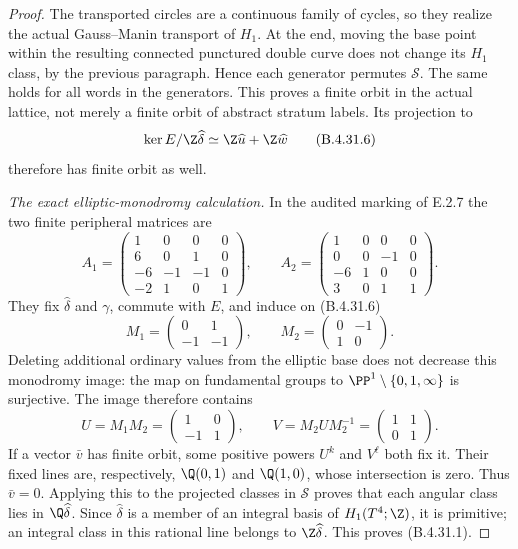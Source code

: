 \begin{proof}
The transported circles are a continuous family of cycles,
so they realize the actual Gauss--Manin transport of $H_1$.
At the end, moving the base point within the resulting
connected punctured double curve does not change its $H_1$
class, by the previous paragraph. Hence each generator
permutes $\mathscr S$. The same holds for all words in the
generators. This proves a finite orbit in the actual lattice,
not merely a finite orbit of abstract stratum labels.
Its projection to
\[
 \ker E/\Z\widehat\delta
       \simeq \Z\widehat u+\Z\widehat w
 \tag{B.4.31.6}
\]
therefore has finite orbit as well.

\emph{The exact elliptic-monodromy calculation.}
In the audited marking of E.2.7 the two finite peripheral
matrices are
\[
 A_1=\begin{pmatrix}
 1&0&0&0\\6&0&1&0\\-6&-1&-1&0\\-2&1&0&1
 \end{pmatrix},\qquad
 A_2=\begin{pmatrix}
 1&0&0&0\\0&0&-1&0\\-6&1&0&0\\3&0&1&1
 \end{pmatrix}.
 \tag{B.4.31.7}
\]
They fix $\widehat\delta$ and $\gamma$, commute with $E$,
and induce on (B.4.31.6)
\[
 M_1=\begin{pmatrix}0&1\\-1&-1\end{pmatrix},\qquad
 M_2=\begin{pmatrix}0&-1\\1&0\end{pmatrix}.
\]
Deleting additional ordinary values from the elliptic base
does not decrease this monodromy image: the map on fundamental
groups to $\PP^1\setminus\{0,1,\infty\}$ is surjective.
The image therefore contains
\[
 U=M_1M_2=\begin{pmatrix}1&0\\-1&1\end{pmatrix},\qquad
 V=M_2UM_2^{-1}=\begin{pmatrix}1&1\\0&1\end{pmatrix}.
 \tag{B.4.31.8}
\]
If a vector $\bar v$ has finite orbit, some positive powers
$U^k$ and $V^\ell$ both fix it. Their fixed lines are,
respectively, $\Q(0,1)$ and $\Q(1,0)$, whose intersection
is zero. Thus $\bar v=0$. Applying this to the projected
classes in $\mathscr S$ proves that each angular class lies
in $\Q\widehat\delta$. Since $\widehat\delta$ is a member
of an integral basis of $H_1(T^4;\Z)$, it is primitive;
an integral class in this rational line belongs to
$\Z\widehat\delta$. This proves (B.4.31.1).


\end{proof}
